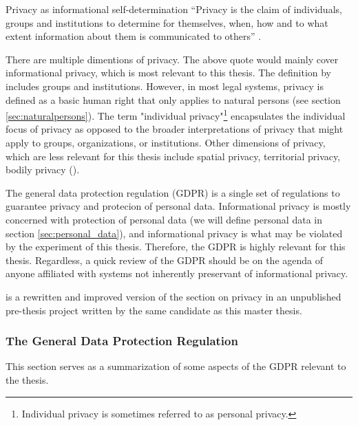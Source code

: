 \begin{myquote}{Privacy as informational self-determination}
    “Privacy is the claim of individuals, groups and institutions to determine for themselves, when, how and to what extent information about them is communicated to others” \cite{we1967privacydefinition}.
\end{myquote}

There are multiple dimentions of privacy. The above quote would mainly cover informational privacy, which is most relevant to this thesis. The definition by \citeauthor{we1967privacydefinition} includes groups and institutions. However, in most legal systems, privacy is defined as a basic human right that only applies to natural persons (see section \ref{sec:naturalpersons}). The term "individual privacy"\footnote{Individual privacy is sometimes referred to as personal privacy.} encapsulates the individual focus of privacy as opposed to the broader interpretations of privacy that might apply to groups, organizations, or institutions. Other dimensions of privacy, which are less relevant for this thesis include spatial privacy, territorial privacy, bodily privacy (\cite{fi2017privacybookchapter53}). 

The general data protection regulation (GDPR) is a single set of regulations to guarantee privacy and protecion of personal data. Informational privacy is mostly concerned with protection of personal data (we will define personal data in section \ref{sec:personal_data}), and informational privacy is what may be violated by the experiment of this thesis. Therefore, the GDPR is highly relevant for this thesis. Regardless, a quick review of the GDPR should be on the agenda of anyone affiliated with systems not inherently preservant of informational privacy.

 is a rewritten and improved version of the section on privacy in an unpublished pre-thesis project written by the same candidate as this master thesis.

\subsubsection{The General Data Protection Regulation}
\label{sec:GDPR}
This section serves as a summarization of some aspects of the GDPR relevant to the thesis.

